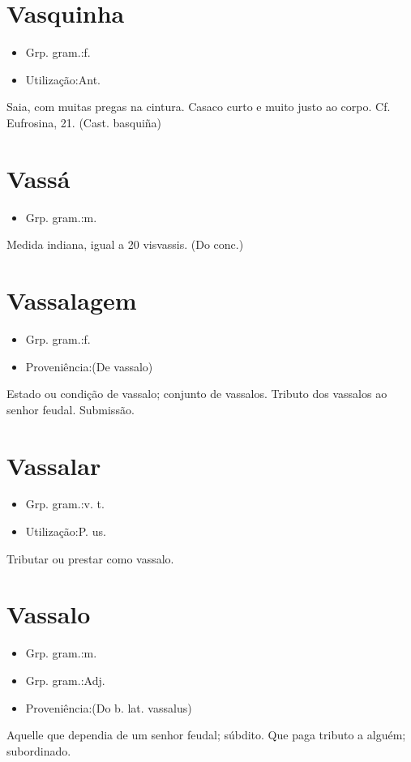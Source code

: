 \documentclass{article}
\begin{document}
\section{Vasquinha}
\begin{itemize}
\item {Grp. gram.:f.}
\end{itemize}
\begin{itemize}
\item {Utilização:Ant.}
\end{itemize}
Saia, com muitas pregas na cintura.
Casaco curto e muito justo ao corpo. Cf. \textunderscore Eufrosina\textunderscore , 21.
(Cast. \textunderscore basquiña\textunderscore )
\section{Vassá}
\begin{itemize}
\item {Grp. gram.:m.}
\end{itemize}
Medida indiana, igual a 20 visvassis.
(Do conc.)
\section{Vassalagem}
\begin{itemize}
\item {Grp. gram.:f.}
\end{itemize}
\begin{itemize}
\item {Proveniência:(De \textunderscore vassalo\textunderscore )}
\end{itemize}
Estado ou condição de vassalo; conjunto de vassalos.
Tributo dos vassalos ao senhor feudal.
Submissão.
\section{Vassalar}
\begin{itemize}
\item {Grp. gram.:v. t.}
\end{itemize}
\begin{itemize}
\item {Utilização:P. us.}
\end{itemize}
Tributar ou prestar como vassalo.
\section{Vassalo}
\begin{itemize}
\item {Grp. gram.:m.}
\end{itemize}
\begin{itemize}
\item {Grp. gram.:Adj.}
\end{itemize}
\begin{itemize}
\item {Proveniência:(Do b. lat. \textunderscore vassalus\textunderscore )}
\end{itemize}
Aquelle que dependia de um senhor feudal; súbdito.
Que paga tributo a alguém; subordinado.
\end{document}
